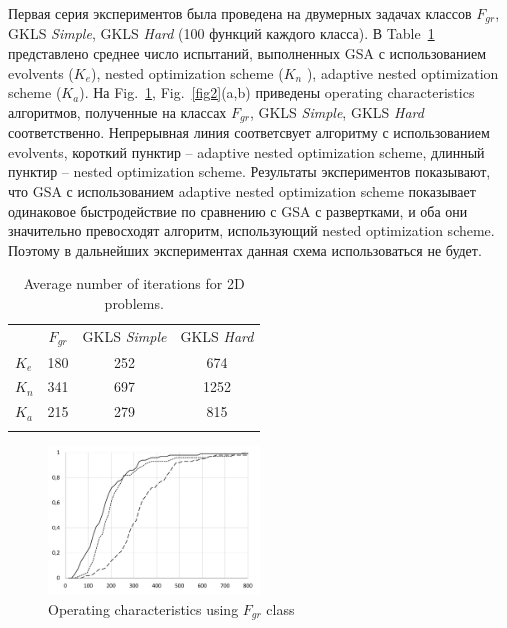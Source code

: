 \documentclass[runningheads]{llncs}
\begin{document}
Первая серия экспериментов была проведена на двумерных задачах классов $F_{gr}$, GKLS \textit{Simple}, GKLS \textit{Hard} (100 функций каждого класса). В Table~\ref{tab1}  представлено среднее число испытаний, выполненных GSA с использованием evolvents ($K_e$), nested optimization scheme ($K_n$ ), adaptive nested optimization scheme ($K_a$). На Fig.~\ref{fig1}, Fig.~\ref{fig2}(a,b) приведены operating characteristics алгоритмов, полученные на классах $F_{gr}$, GKLS \textit{Simple}, GKLS \textit{Hard} соответственно. Непрерывная линия соответсвует алгоритму с использованием evolvents, короткий пунктир -- adaptive nested optimization scheme, длинный пунктир -- nested optimization scheme. Результаты экспериментов показывают, что GSA с использованием adaptive nested optimization scheme показывает одинаковое быстродействие  по сравнению с GSA с развертками, и оба они значительно превосходят алгоритм, использующий nested optimization scheme. 
Поэтому в дальнейших экспериментах данная схема использоваться не будет.

\begin{table}
\centering
\caption{Average number of iterations for 2D problems.}\label{tab1}
\begin{tabular}{lccc}
\hline\noalign{\smallskip}
 &  $F_{gr}$  &  GKLS \textit{Simple} &  GKLS \textit{Hard} \\
\noalign{\smallskip}\hline\noalign{\smallskip}
 $K_e$ & 180  & 252 & 674 \\
 $K_n$ & 341  & 697 & 1252 \\
 $K_a$ & 215  & 279 & 815 \\
\noalign{\smallskip}\hline
\end{tabular}
\end{table}

\begin{figure}
\centering
\includegraphics[width=0.50\textwidth]{2D.pdf}
\caption{Operating characteristics using $F_{gr}$ class} 
\label{fig1}
\end{figure}
\end{document}
